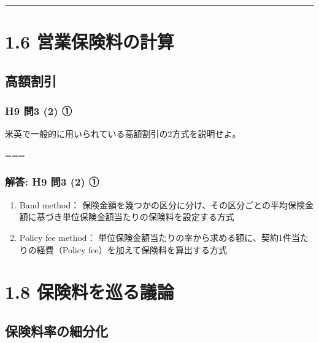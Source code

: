 \documentclass[
]{article}
\providecommand{\tightlist}{%
  \setlength{\itemsep}{0pt}\setlength{\parskip}{0pt}}
\begin{document}
\begin{center}\rule{0.5\linewidth}{0.5pt}\end{center}

\hypertarget{ux55b6ux696dux4fddux967aux6599ux306eux8a08ux7b97}{%
\section{1.6
営業保険料の計算}\label{ux55b6ux696dux4fddux967aux6599ux306eux8a08ux7b97}}

\hypertarget{ux9ad8ux984dux5272ux5f15}{%
\subsection{高額割引}\label{ux9ad8ux984dux5272ux5f15}}

\hypertarget{h9-ux554f3-2-ux2460}{%
\subsubsection{H9 問3 (2) ①}\label{h9-ux554f3-2-ux2460}}

米英で一般的に用いられている高額割引の2方式を説明せよ。

===

\hypertarget{ux89e3ux7b54-h9-ux554f3-2-ux2460}{%
\subsubsection{解答: H9 問3 (2)
①}\label{ux89e3ux7b54-h9-ux554f3-2-ux2460}}

\begin{enumerate}
\def\labelenumi{\arabic{enumi}.}
\tightlist
\item
  Band method：
  保険金額を幾つかの区分に分け、その区分ごとの平均保険金額に基づき単位保険金額当たりの保険料を設定する方式
\item
  Policy fee method：
  単位保険金額当たりの率から求める額に、契約1件当たりの経費（Policy
  fee）を加えて保険料を算出する方式
\end{enumerate}

\hypertarget{ux4fddux967aux6599ux3092ux5de1ux308bux8b70ux8ad6}{%
\section{1.8
保険料を巡る議論}\label{ux4fddux967aux6599ux3092ux5de1ux308bux8b70ux8ad6}}

\hypertarget{ux4fddux967aux6599ux7387ux306eux7d30ux5206ux5316}{%
\subsection{保険料率の細分化}\label{ux4fddux967aux6599ux7387ux306eux7d30ux5206ux5316}}
\end{document}
